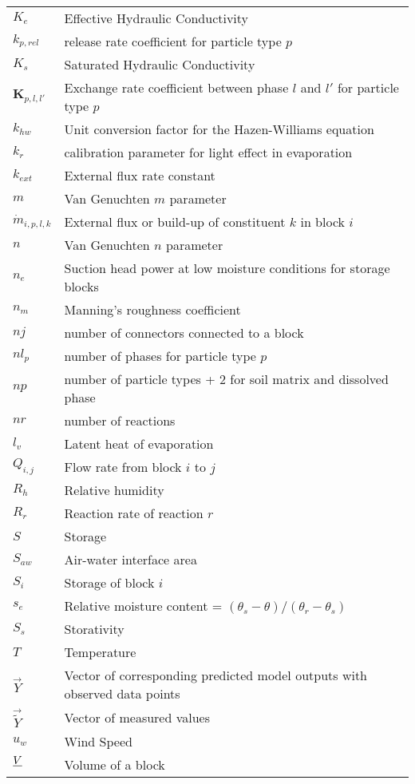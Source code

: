 \begin{longtable}{| p{} | p{} |}
$K_e$ & Effective Hydraulic Conductivity \\
$k_{p,rel}$ & release rate coefficient for particle type $p$ \\
$K_s$ & Saturated Hydraulic Conductivity \\
$\textbf{K}_{p,l,l'}$ & Exchange rate coefficient between phase $l$ and $l'$ for particle type $p$ \\
$k_{hw}$ & Unit conversion factor for the Hazen-Williams equation \\
$k_r$ & calibration parameter for light effect in evaporation \\
$k_{ext}$& External flux rate constant \\
$m$ & Van Genuchten $m$ parameter \\
$\dot{m}_{i,p,l,k}$ & External flux or build-up of constituent $k$ in block $i$ \\
$n$ & Van Genuchten $n$ parameter \\
$n_e$ & Suction head power at low moisture conditions for storage blocks \\
$n_m$ & Manning's roughness coefficient\\
$nj$ & number of connectors connected to a block \\
$nl_p$ & number of phases for particle type $p$\\
$np$ & number of particle types + 2 for soil matrix and dissolved phase \\
$nr$ & number of reactions \\
$l_v$ & Latent heat of evaporation \\
$Q_{i,j}$ & Flow rate from block $i$ to $j$\\
$R_h$ & Relative humidity \\
$R_r$ & Reaction rate of reaction $r$ \\
$S$ & Storage\\
$S_{aw}$ & Air-water interface area \\
$S_i$ & Storage of block $i$ \\
$s_e$ & Relative moisture content = $(\theta_s-\theta)/(\theta_r-\theta_s)$ \\ 
$S_s$ & Storativity \\
$T$ & Temperature \\
$\vec{Y}$ & Vector of corresponding predicted model outputs with observed data points\\
$\vec{\tilde Y}$ & Vector of measured values \\
$u_w$ & Wind Speed \\
$\sout{V}$ & Volume of a block \\

\end{longtable}
